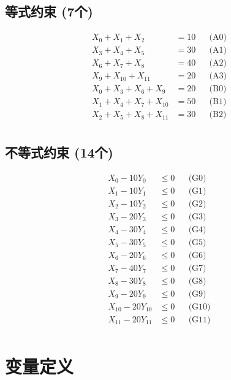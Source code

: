 \documentclass[a4paper,10pt]{article}
\begin{document}
\subsection{等式约束 (7个)}

\allowdisplaybreaks
{\small
\begin{align}
X_{0} + X_{1} + X_{2} &= 10 && \text{(A0)} \\
X_{3} + X_{4} + X_{5} &= 30 && \text{(A1)} \\
X_{6} + X_{7} + X_{8} &= 40 && \text{(A2)} \\
X_{9} + X_{10} + X_{11} &= 20 && \text{(A3)} \\
X_{0} + X_{3} + X_{6} + X_{9} &= 20 && \text{(B0)} \\
\allowbreak
X_{1} + X_{4} + X_{7} + X_{10} &= 50 && \text{(B1)} \\
X_{2} + X_{5} + X_{8} + X_{11} &= 30 && \text{(B2)} \\
\end{align}
}

\subsection{不等式约束 (14个)}

\allowdisplaybreaks
{\small
\begin{align}
X_{0} - 10Y_{0} &\leq 0 && \text{(G0)} \\
X_{1} - 10Y_{1} &\leq 0 && \text{(G1)} \\
X_{2} - 10Y_{2} &\leq 0 && \text{(G2)} \\
X_{3} - 20Y_{3} &\leq 0 && \text{(G3)} \\
X_{4} - 30Y_{4} &\leq 0 && \text{(G4)} \\
X_{5} - 30Y_{5} &\leq 0 && \text{(G5)} \\
X_{6} - 20Y_{6} &\leq 0 && \text{(G6)} \\
X_{7} - 40Y_{7} &\leq 0 && \text{(G7)} \\
X_{8} - 30Y_{8} &\leq 0 && \text{(G8)} \\
X_{9} - 20Y_{9} &\leq 0 && \text{(G9)} \\
\allowbreak
X_{10} - 20Y_{10} &\leq 0 && \text{(G10)} \\
X_{11} - 20Y_{11} &\leq 0 && \text{(G11)} \\
\end{align}
}

\section{变量定义}
\end{document}
